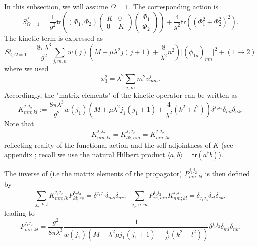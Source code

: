 \documentclass[10pt]{book}
\newcommand{\tr}{\mathsf{tr}}
\theoremstyle{break}
\begin{document}


In this subsection, we will assume $\Omega=1$. The corresponding action is%
%
\begin{equation*}
S^f_{\Omega=1} = \frac{1}{g^2} \tr( (\Phi_1,\Phi_2)
\begin{pmatrix}
K&0\\
0&K
\end{pmatrix} 
\begin{pmatrix}
\Phi_1\\
\Phi_2
\end{pmatrix} 
)
+ \frac{4}{g^2} \tr( (\Phi_1^2 + \Phi_2^2)^2).%
\end{equation*}
%
The kinetic term is expressed as 
\begin{equation*}
S^f_{2, \Omega=1}=\frac{8\pi\lambda^3}{g^2}\sum_{j,m,n}w(j)(M+\mu\lambda^2j(j+1)+\frac{8}{\lambda^2}n^2)\vert(\phi_{1\mu})_{mn}\vert^2+(1\to2)%
\end{equation*}
where we used
\begin{equation*}
x_3^2 = \lambda^2 \sum_{j,m} m^2 v^j_{mm}.
\end{equation*}
Accordingly, the "matrix elements" of the kinetic operator can be written as
\begin{equation*}
K^{j_1 j_2}_{mn;kl} := \frac{8\pi\lambda^3}{g^2} w(j_1) ( M + \mu \lambda^2 j_1 (j_1+1) + \frac{4}{\lambda^2} (k^2+l^2) ) \delta^{j_1j_2} \delta_{ml} \delta_{nk}. %
\end{equation*}
Note that %
%
\begin{equation*}
K^{j_1j_2}_{mn;kl} = K^{j_1j_2}_{lk;nm} = K^{j_1j_2}_{mn;lk} %
\end{equation*}
%
reflecting reality of the functional action and the self-adjointness of $K$ (see appendix %
; recall we use the natural Hilbert product $\langle a,b \rangle = \tr(a^\dag b)$).\par

The inverse of %
(i.e the matrix elements of the propagator) $P^{j_1j_2}_{mn;kl}$ is then defined by%
%
\begin{equation*}
\sum_{j_2,k,l} K^{j_1j_2}_{mn;lk} P^{j_2j_3}_{kl;rs} = \delta^{j_1j_3} \delta_{ms} \delta_{nr}, \ \ \sum_{j_2,n,m} P^{j_1j_2}_{rs;mn} K^{j_2j_3}_{nm;kl} = \delta_{j_1j_3} \delta_{rl} \delta_{sk}, %
\end{equation*}
%
leading to%
%
\begin{equation*}
P^{j_1j_2}_{mn;kl} = \frac{g^2}{8\pi\lambda^3} \frac{1}{w(j_1)(M+\lambda^2\mu j_1(j_1+1)+\frac{4}{\lambda^2}(k^2+l^2))}\delta^{j_1j_2}\delta_{ml}\delta_{nk}.  %
\end{equation*}
\end{document}
